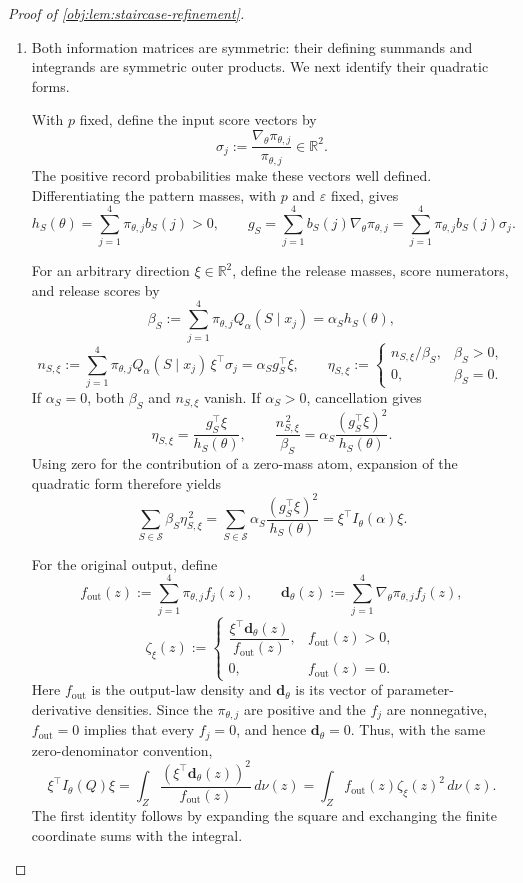 \begin{proof}[Proof of \cref{obj:lem:staircase-refinement}]
\begin{enumerate}
\item
Both information matrices are symmetric: their defining summands and integrands are symmetric outer products. We next identify their quadratic forms.

With \(p\) fixed, define the input score vectors by
\[
\sigma_j:=\frac{\nabla_\theta\pi_{\theta,j}}{\pi_{\theta,j}}
\in\mathbb R^2.
\]
The positive record probabilities make these vectors well defined. Differentiating the pattern masses, with \(p\) and \(\varepsilon\) fixed, gives
\[
h_S(\theta)=\sum_{j=1}^{4}\pi_{\theta,j}b_S(j)>0,
\qquad
g_S
=\sum_{j=1}^{4}b_S(j)\nabla_\theta\pi_{\theta,j}
=\sum_{j=1}^{4}\pi_{\theta,j}b_S(j)\sigma_j.
\]

For an arbitrary direction \(\xi\in\mathbb R^2\), define the release masses, score numerators, and release scores by
\[
\beta_S:=
\sum_{j=1}^{4}\pi_{\theta,j}Q_\alpha(S\mid x_j)
=\alpha_S h_S(\theta),
\]
\[
n_{S,\xi}:=
\sum_{j=1}^{4}\pi_{\theta,j}Q_\alpha(S\mid x_j)
\,\xi^\top\sigma_j
=\alpha_S g_S^\top\xi,
\qquad
\eta_{S,\xi}:=
\begin{cases}
n_{S,\xi}/\beta_S,&\beta_S>0,\\
0,&\beta_S=0.
\end{cases}
\]
If \(\alpha_S=0\), both \(\beta_S\) and \(n_{S,\xi}\) vanish. If \(\alpha_S>0\), cancellation gives
\[
\eta_{S,\xi}=\frac{g_S^\top\xi}{h_S(\theta)},
\qquad
\frac{n_{S,\xi}^{\,2}}{\beta_S}
=\alpha_S\frac{(g_S^\top\xi)^2}{h_S(\theta)}.
\]
Using zero for the contribution of a zero-mass atom, expansion of the quadratic form therefore yields
\[
\sum_{S\in\mathcal S}\beta_S\eta_{S,\xi}^{\,2}
=
\sum_{S\in\mathcal S}
\alpha_S\frac{(g_S^\top\xi)^2}{h_S(\theta)}
=\xi^\top I_\theta(\alpha)\xi.
\]

For the original output, define
\[
f_{\mathrm{out}}(z):=
\sum_{j=1}^{4}\pi_{\theta,j}f_j(z),
\qquad
\mathbf d_\theta(z):=
\sum_{j=1}^{4}\nabla_\theta\pi_{\theta,j}f_j(z),
\]
\[
\zeta_\xi(z):=
\begin{cases}
\dfrac{\xi^\top\mathbf d_\theta(z)}{f_{\mathrm{out}}(z)},
   &f_{\mathrm{out}}(z)>0,\\
0,&f_{\mathrm{out}}(z)=0.
\end{cases}
\]
Here \(f_{\mathrm{out}}\) is the output-law density and
\(\mathbf d_\theta\) is its vector of parameter-derivative densities.
Since the \(\pi_{\theta,j}\) are positive and the \(f_j\) are nonnegative,
\(f_{\mathrm{out}}=0\) implies that every \(f_j=0\), and hence
\(\mathbf d_\theta=0\). Thus, with the same zero-denominator convention,
\[
\xi^\top I_\theta(Q)\xi
=
\int_Z
\frac{(\xi^\top\mathbf d_\theta(z))^2}{f_{\mathrm{out}}(z)}
\,d\nu(z)
=
\int_Z f_{\mathrm{out}}(z)\zeta_\xi(z)^2\,d\nu(z).
\]
The first identity follows by expanding the square and exchanging the finite coordinate sums with the integral.


\end{enumerate}
\end{proof}
